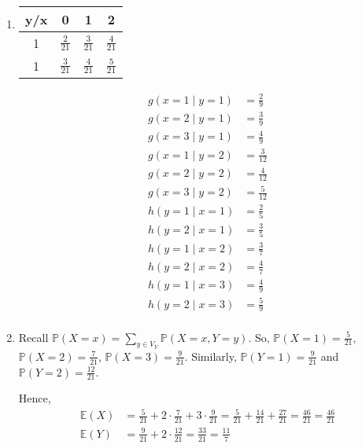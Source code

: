 \documentclass[12pt]{article}
\begin{document}
\begin{enumerate}[start=1,label={\bfseries Problem \arabic*:},leftmargin=1in]
    \item 
    
    \begin{table}[h]
        \centering
        \begin{tabular}{|c|c|c|c|}
            \hline 
            y/x & 0 & 1 & 2 \\
            \hline
            1 & $\frac{2}{21}$ & $\frac{3}{21}$ & $\frac{4}{21}$ \\
            \hline
            1 & $\frac{3}{21}$ & $\frac{4}{21}$ & $\frac{5}{21}$ \\
            \hline
        \end{tabular}

    \end{table}
    \begin{align*}
        g(x=1\mid y=1) &= \frac{2}{9}\\ 
        g(x=2\mid y=1) &= \frac{3}{9}\\
        g(x=3\mid y=1) &= \frac{4}{9}\\
        g(x=1\mid y=2) &= \frac{3}{12}\\
        g(x=2\mid y=2) &= \frac{4}{12}\\
        g(x=3\mid y=2) &= \frac{5}{12}\\
        h(y=1\mid x=1) &= \frac{2}{5}\\ 
        h(y=2\mid x=1) &= \frac{3}{5}\\
        h(y=1\mid x=2) &= \frac{3}{7}\\
        h(y=2\mid x=2) &= \frac{4}{7}\\
        h(y=1\mid x=3) &= \frac{4}{9}\\
        h(y=2\mid x=3) &= \frac{5}{9}\\
    \end{align*} 

    \item Recall $\mathbb{P}(X = x) = \sum_{y \in V_{Y}} \mathbb{P}(X = x, Y = y)$.
    So, $\mathbb{P}(X=1) = \frac{5}{21}$, $\mathbb{P}(X=2) = \frac{7}{21}$, $\mathbb{P}(X=3) = \frac{9}{21}$.
    Similarly, $\mathbb{P}(Y=1) = \frac{9}{21}$ and $\mathbb{P}(Y=2) = \frac{12}{21}$. 

    Hence, 
    \begin{align*}
        \mathbb{E}(X) &= \frac{5}{21} + 2 \cdot \frac{7}{21} + 3 \cdot \frac{9}{21} = \frac{5}{21} + \frac{14}{21} + \frac{27}{21} = \frac{46}{21} = \frac{46}{21}\\
        \mathbb{E}(Y) &= \frac{9}{21} + 2 \cdot \frac{12}{21} = \frac{33}{21} = \frac{11}{7}
    \end{align*}


\end{enumerate}
\end{document}
